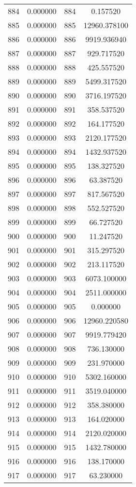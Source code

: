 \documentclass[12pt]{article}
\begin{document}
\begin{longtable}{@{}cccc@{}}
884 & 0.000000 & 884 & 0.157520 \\
885 & 0.000000 & 885 & 12960.378100 \\
886 & 0.000000 & 886 & 9919.936940 \\
887 & 0.000000 & 887 & 929.717520 \\
888 & 0.000000 & 888 & 425.557520 \\
889 & 0.000000 & 889 & 5499.317520 \\
890 & 0.000000 & 890 & 3716.197520 \\
891 & 0.000000 & 891 & 358.537520 \\
892 & 0.000000 & 892 & 164.177520 \\
893 & 0.000000 & 893 & 2120.177520 \\
894 & 0.000000 & 894 & 1432.937520 \\
895 & 0.000000 & 895 & 138.327520 \\
896 & 0.000000 & 896 & 63.387520 \\
897 & 0.000000 & 897 & 817.567520 \\
898 & 0.000000 & 898 & 552.527520 \\
899 & 0.000000 & 899 & 66.727520 \\
900 & 0.000000 & 900 & 11.247520 \\
901 & 0.000000 & 901 & 315.297520 \\
902 & 0.000000 & 902 & 213.117520 \\
903 & 0.000000 & 903 & 6073.100000 \\
904 & 0.000000 & 904 & 2511.000000 \\
905 & 0.000000 & 905 & 0.000000 \\
906 & 0.000000 & 906 & 12960.220580 \\
907 & 0.000000 & 907 & 9919.779420 \\
908 & 0.000000 & 908 & 736.130000 \\
909 & 0.000000 & 909 & 231.970000 \\
910 & 0.000000 & 910 & 5302.160000 \\
911 & 0.000000 & 911 & 3519.040000 \\
912 & 0.000000 & 912 & 358.380000 \\
913 & 0.000000 & 913 & 164.020000 \\
914 & 0.000000 & 914 & 2120.020000 \\
915 & 0.000000 & 915 & 1432.780000 \\
916 & 0.000000 & 916 & 138.170000 \\
917 & 0.000000 & 917 & 63.230000 \\

\end{longtable}
\end{document}
